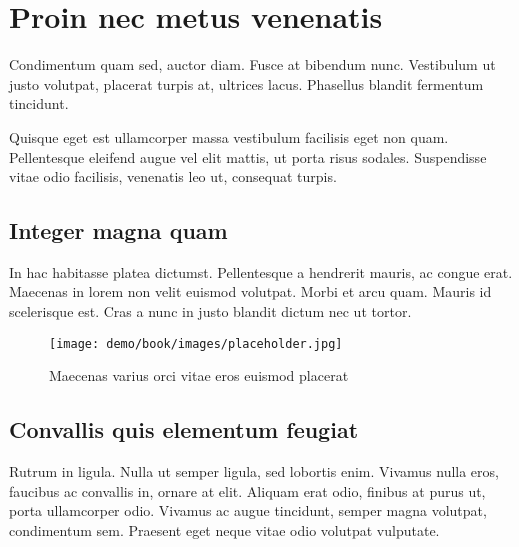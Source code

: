 \section{Proin nec metus venenatis} \label{sec:proin}

Condimentum quam sed, auctor diam. Fusce at bibendum nunc. Vestibulum ut justo
volutpat, placerat turpis at, ultrices lacus. Phasellus blandit fermentum tincidunt.

Quisque eget est ullamcorper massa vestibulum facilisis eget non quam. Pellentesque
eleifend augue vel elit mattis, ut porta risus sodales. Suspendisse vitae odio
facilisis, venenatis leo ut, consequat turpis.

\subsection{Integer magna quam}

In hac habitasse platea dictumst. Pellentesque a hendrerit mauris, ac congue
erat. Maecenas in lorem non velit euismod volutpat. Morbi et arcu quam. Mauris
id scelerisque est. Cras a nunc in justo blandit dictum nec ut tortor\cite{SCELERISQUE}.

\begin{figure}[hb]
\centering\texttt{[image: demo/book/images/placeholder.jpg]}
\caption{Maecenas varius orci vitae eros euismod placerat} \label{fig:integer}
\end{figure}

\subsection{Convallis quis elementum feugiat}

Rutrum in ligula. Nulla ut semper ligula, sed lobortis enim. Vivamus nulla eros,
faucibus ac convallis in, ornare at elit. Aliquam erat odio, finibus at purus ut,
porta ullamcorper odio. Vivamus ac augue tincidunt, semper magna volutpat,
condimentum sem. Praesent eget neque vitae odio volutpat vulputate.
